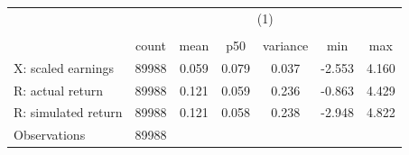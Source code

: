 {
\def\sym#1{\ifmmode^{#1}\else\(^{#1}\)\fi}
\begin{tabular}{l*{1}{cccccc}}
\hline\hline
                    &\multicolumn{6}{c}{(1)}                                                      \\
                    &\multicolumn{6}{c}{}                                                         \\
                    &       count&        mean&         p50&    variance&         min&         max\\
\hline
X: scaled earnings  &       89988&       0.059&       0.079&       0.037&      -2.553&       4.160\\
R: actual return    &       89988&       0.121&       0.059&       0.236&      -0.863&       4.429\\
R: simulated return &       89988&       0.121&       0.058&       0.238&      -2.948&       4.822\\
\hline
Observations        &       89988&            &            &            &            &            \\
\hline\hline
\end{tabular}
}
